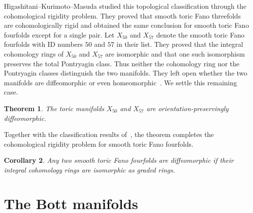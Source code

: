 \documentclass{amsart}
\newtheorem{theorem}{Theorem}[section]
\newtheorem{corollary}[theorem]{Corollary}
\numberwithin{equation}{section}
\theoremstyle{definition}
\begin{document}
Higashitani--Kurimoto--Masuda \cite{Higashitani-Kurimoto-Masuda2022} studied this topological classification through the cohomological rigidity problem. 
They proved that smooth toric Fano threefolds are cohomologically rigid and obtained the same conclusion for smooth toric Fano fourfolds except for a single pair. 
Let $X_{50}$ and $X_{57}$ denote the smooth toric Fano fourfolds with ID numbers $50$ and $57$ in their list. 
They proved that the integral cohomology rings of $X_{50}$ and $X_{57}$ are isomorphic and that one such isomorphism preserves the total Pontryagin class. 
Thus neither the cohomology ring nor the Pontryagin classes distinguish the two manifolds. 
They left open whether the two manifolds are diffeomorphic or even homeomorphic~\cite[Question~5.1]{Higashitani-Kurimoto-Masuda2022}. 
We settle this remaining case.

\begin{theorem} \label{thm:main}
    The toric manifolds $X_{50}$ and $X_{57}$ are orientation-preservingly diffeomorphic.
\end{theorem}

Together with the classification results of~\cite{Higashitani-Kurimoto-Masuda2022}, the theorem completes the cohomological rigidity problem for smooth toric Fano fourfolds.

\begin{corollary}
    Any two smooth toric Fano fourfolds are diffeomorphic if their integral cohomology rings are isomorphic as graded rings.
\end{corollary}


\section{The Bott manifolds}\label{sec:fan-bott}
\end{document}

